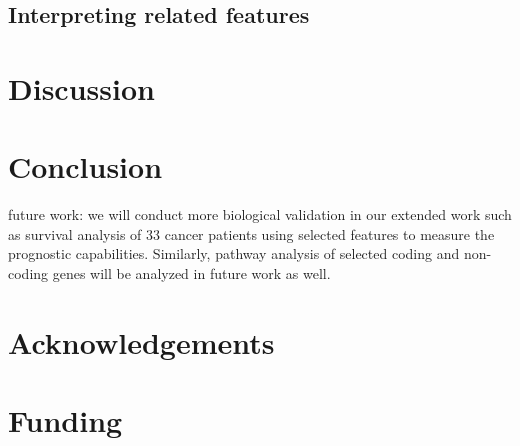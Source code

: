 \documentclass{bioinfo}
\begin{document}
\subsection{Interpreting related features}

\section{Discussion}

\section{Conclusion}

future work: we will conduct more biological validation in our extended work such as survival analysis of 33 cancer patients using selected features to measure the prognostic capabilities. Similarly, pathway analysis of selected coding and non-coding genes will be analyzed in future work as well.

\section*{Acknowledgements}


\section*{Funding}


%
%
%
%
%
%
%






\end{document}
